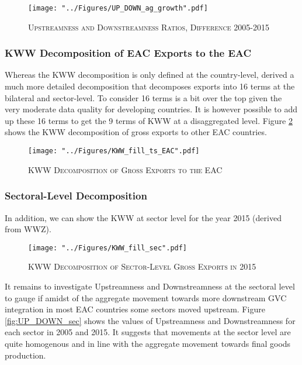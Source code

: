 \documentclass[a4paper]{article}
\begin{document}
\begin{figure}[h!]
\centering
\caption{\label{fig:UP_DOWN_ag_growth}\textsc{Upstreamness and Downstreamness Ratios, Difference 2005-2015}}
\texttt{[image: "../Figures/UP\_DOWN\_ag\_growth".pdf]} %
\end{figure}
\FloatBarrier


\subsubsection{KWW Decomposition of EAC Exports to the EAC}

Whereas the KWW decomposition is only defined at the country-level, \citet{wang2013quantifying} derived a much more detailed decomposition that decomposes exports into 16 terms at the bilateral and sector-level. To consider 16 terms is a bit over the top given the very moderate data quality for developing countries. It is however possible to add up these 16 terms to get the 9 terms of KWW at a disaggregated level. Figure \ref{fig:KWW_fill_ts_EAC} shows the KWW decomposition of gross exports to other EAC countries. 

\begin{figure}[h!]
\centering
\caption{\label{fig:KWW_fill_ts_EAC}\textsc{KWW Decomposition of Gross Exports to the EAC}}
\texttt{[image: "../Figures/KWW\_fill\_ts\_EAC".pdf]} %
\end{figure}
\FloatBarrier


\subsubsection{Sectoral-Level Decomposition}
In addition, we can show the KWW at sector level for the year 2015 (derived from WWZ).

\begin{figure}[h!]
\centering
\caption{\label{fig:KWW_fill_sec}\textsc{KWW Decomposition of Sector-Level Gross Exports in 2015}}
\texttt{[image: "../Figures/KWW\_fill\_sec".pdf]} %
\end{figure}
\FloatBarrier

It remains to investigate Upstreamness and Downstreamness at the sectoral level to gauge if amidst of the aggregate movement towards more downstream GVC integration in most EAC countries some sectors moved upstream. Figure \ref{fig:UP_DOWN_sec} shows the values of Upstreamness and Downstreamness for each sector in 2005 and 2015. It suggests that movements at the sector level are quite homogenous and in line with the aggregate movement towards final goods production. 
\end{document}
